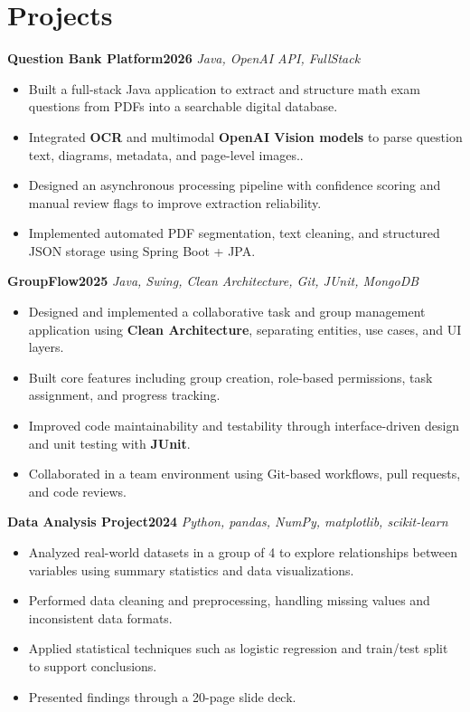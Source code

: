 \documentclass[10.5pt]{article}
\newcommand{\roleline}[2]{\textbf{#1}\hfill \textbf{#2}}
\newcommand{\orgline}[2]{\textit{#1}\hfill \textit{#2}}
\begin{document}
\section*{Projects}

\roleline{Question Bank Platform}{2026}
\orgline{Java, OpenAI API, FullStack}{}
\begin{itemize}
  \item Built a full-stack Java application to extract and structure math exam questions from PDFs into a searchable digital database.
  \item Integrated \textbf{OCR} and multimodal \textbf{OpenAI Vision models} to parse question text, diagrams, metadata, and page-level images..
  \item Designed an asynchronous processing pipeline with confidence scoring and manual review flags to improve extraction reliability.
  \item Implemented automated PDF segmentation, text cleaning, and structured JSON storage using Spring Boot + JPA.
\end{itemize}

\vspace{8pt}

\roleline{GroupFlow}{2025}
\orgline{Java, Swing, Clean Architecture, Git, JUnit, MongoDB}{}
\begin{itemize}
  \item Designed and implemented a collaborative task and group management application using \textbf{Clean Architecture}, separating entities, use cases, and UI layers.
  \item Built core features including group creation, role-based permissions, task assignment, and progress tracking.
  \item Improved code maintainability and testability through interface-driven design and unit testing with \textbf{JUnit}.
  \item Collaborated in a team environment using Git-based workflows, pull requests, and code reviews.
\end{itemize}

\vspace{8pt}

\roleline{Data Analysis Project}{2024}
\orgline{Python, pandas, NumPy, matplotlib, scikit-learn}{}
\begin{itemize}
  \item Analyzed real-world datasets in a group of 4 to explore relationships between variables using summary statistics and data visualizations.
  \item Performed data cleaning and preprocessing, handling missing values and inconsistent data formats.
  \item Applied statistical techniques such as logistic regression and train/test split to support conclusions.
  \item Presented findings through a 20-page slide deck.
\end{itemize}
\end{document}
